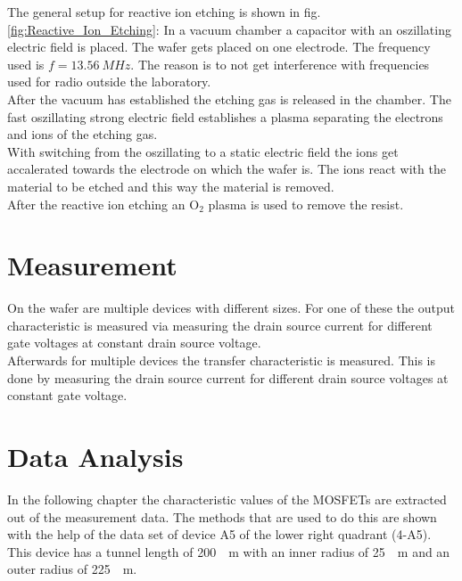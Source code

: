 \documentclass[%
 reprint,
amsmath,amssymb,
pra,
]{revtex4-1}
\begin{document}
The general setup for reactive ion etching is shown in fig. \ref{fig:Reactive_Ion_Etching}: In a vacuum chamber a capacitor with an oszillating electric field is placed. The wafer gets placed on one electrode. The frequency used is $f = \SI{13.56}{MHz}$. The reason is to not get interference with frequencies used for radio outside the laboratory. \\
After the vacuum has established the etching gas is released in the chamber. The fast oszillating strong electric field establishes a plasma separating the electrons and ions of the etching gas. \\
With switching from the oszillating to a static electric field the ions get accalerated towards the electrode on which the wafer is. The ions react with the material to be etched and this way the material is removed. \\
After the reactive ion etching an O$_2$ plasma is used to remove the resist.


\section{Measurement}
On the wafer are multiple devices with different sizes. For one of these the output characteristic is measured via measuring the drain source current for different gate voltages at constant drain source voltage. \\
Afterwards for multiple devices the transfer characteristic is measured. This is done by measuring the drain source current for different drain source voltages at constant gate voltage.

\section{Data Analysis}
In the following chapter the characteristic values of the MOSFETs are extracted out of the measurement data. The methods that are used to do this are shown with the help of the data set of device A5 of the lower right quadrant (4-A5). This device has a tunnel length of \SI{200}{\mu m} with an inner radius of \SI{25}{\mu m} and an outer radius of \SI{225}{\mu m}.
\end{document}
